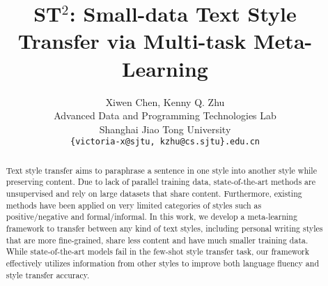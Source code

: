 \documentclass[11pt,a4paper]{article}
\title{ST$^2$: Small-data Text Style Transfer via Multi-task Meta-Learning}
\author{Xiwen Chen, Kenny Q. Zhu \\
  Advanced Data and Programming Technologies Lab \\
  Shanghai Jiao Tong University \\
  \texttt{\{victoria-x@sjtu, kzhu@cs.sjtu\}.edu.cn} \\
}
\date{}
\begin{document}
\maketitle
\begin{abstract}

Text style transfer aims to paraphrase a sentence in one style into another style while preserving content. Due to lack of parallel training data, state-of-the-art methods are unsupervised and rely on large datasets that share content. Furthermore, existing methods have been applied on very limited categories of styles such as positive/negative and formal/informal. In this work, we develop a meta-learning framework to transfer between any kind of text styles, including personal writing styles that are more fine-grained, share less content and have much smaller training data. While state-of-the-art models fail in the few-shot style transfer task, our framework effectively utilizes information from other styles to improve both language fluency and style transfer accuracy. 

\end{abstract}






%


\end{document}
